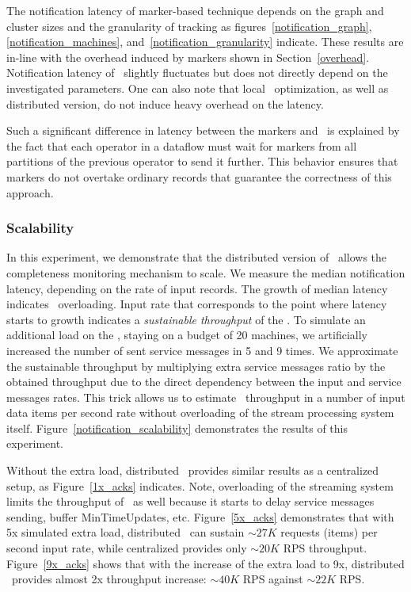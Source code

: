 The notification latency of marker-based technique depends on the graph and cluster sizes and the granularity of tracking as figures~\ref{notification_graph},\ref{notification_machines}, and~\ref{notification_granularity} indicate. These results are in-line with the overhead induced by markers shown in Section~\ref{overhead}. Notification latency of \tracker\ slightly fluctuates but does not directly depend on the investigated parameters. One can also note that local \tracker\ optimization, as well as distributed version, do not induce heavy overhead on the latency.

Such a significant difference in latency between the markers and \tracker\ is explained by the fact that each operator in a dataflow must wait for markers from all partitions of the previous operator to send it further. This behavior ensures that markers do not overtake ordinary records that guarantee the correctness of this approach.

\subsubsection{Scalability}

In this experiment, we demonstrate that the distributed version of \tracker\ allows the completeness monitoring mechanism to scale. We measure the median notification latency, depending on the rate of input records. The growth of median latency indicates \tracker\ overloading. Input rate that corresponds to the point where latency starts to growth indicates a {\em sustainable throughput} of the \tracker . To simulate an additional load on the \tracker , staying on a budget of 20 machines, we artificially increased the number of sent service messages in 5 and 9 times. We approximate the sustainable throughput by multiplying extra service messages ratio by the obtained throughput due to the direct dependency between the input and service messages rates. This trick allows us to estimate \tracker\ throughput in a number of input data items per second rate without overloading of the stream processing system itself. Figure~\ref{notification_scalability} demonstrates the results of this experiment.

Without the extra load, distributed \tracker\ provides similar results as a centralized setup, as Figure~\ref{1x_acks} indicates. Note, overloading of the streaming system limits the throughput of \tracker\ as well because it starts to delay service messages sending, buffer MinTimeUpdates, etc. Figure~\ref{5x_acks} demonstrates that with 5x simulated extra load, distributed \tracker\ can sustain $\sim 27K$ requests (items) per second input rate, while centralized provides only $\sim 20K$ RPS throughput. Figure~\ref{9x_acks} shows that with the increase of the extra load to 9x, distributed \tracker\ provides almost 2x throughput increase: $\sim 40K$ RPS against $\sim 22K$ RPS. 

